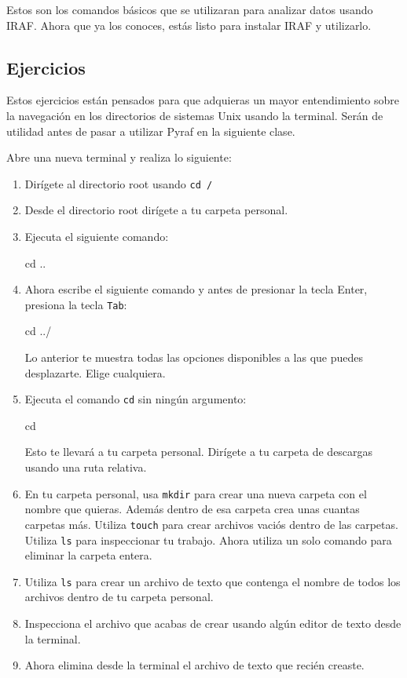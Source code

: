 Estos son los comandos básicos que se utilizaran para analizar datos usando IRAF. Ahora que ya los conoces, estás listo para instalar IRAF y utilizarlo.

\subsection{Ejercicios}
Estos ejercicios están pensados para que adquieras un mayor entendimiento sobre la navegación en los directorios de sistemas Unix usando la terminal. Serán de utilidad antes de pasar a utilizar Pyraf en la siguiente clase.

Abre una nueva terminal y realiza lo siguiente:
\begin{enumerate}
    \item Dirígete al directorio root usando \texttt{cd /}
    \item Desde el directorio root dirígete a tu carpeta personal.
    \item Ejecuta el siguiente comando: 
    \begin{bash}
    cd ..
    \end{bash}

    \item Ahora escribe el siguiente comando y antes de presionar la tecla Enter, presiona la tecla \texttt{Tab}:

    \begin{bash}
    cd ../
    \end{bash}
    Lo anterior te muestra todas las opciones disponibles a las que puedes desplazarte. Elige cualquiera.

    \item Ejecuta el comando \texttt{cd} sin ningún argumento:
    \begin{bash}
    cd
    \end{bash}
    Esto te llevará a tu carpeta personal. Dirígete a tu carpeta de descargas usando una ruta relativa.

    \item En tu carpeta personal, usa \texttt{mkdir} para crear una nueva carpeta con el nombre que quieras. Además dentro de esa carpeta crea unas cuantas carpetas más. Utiliza \texttt{touch} para crear archivos vaciós dentro de las carpetas. Utiliza \texttt{ls} para inspeccionar tu trabajo. Ahora utiliza un solo comando para eliminar la carpeta entera.

    \item Utiliza \texttt{ls} para crear un archivo de texto que contenga el nombre de todos los archivos dentro de tu carpeta personal.

    \item Inspecciona el archivo que acabas de crear usando algún editor de texto desde la terminal.

    \item Ahora elimina desde la terminal el archivo de texto que recién creaste.
\end{enumerate}
